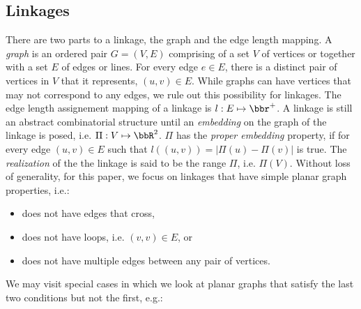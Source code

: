 \subsection{Linkages}
There are two parts to a linkage, the graph and the edge length mapping.   A \textit{graph} is an 
ordered pair $G = (V,E)$ comprising of a set $V$ of vertices or together with a set $E$ of edges or 
lines.  For every edge $e \in E$, there is a distinct pair of vertices in $V$ that it represents, 
$(u,v) \in E$.  While graphs can have vertices that may not correspond to any edges, we rule out 
this possibility for linkages.  The edge length assignement mapping of a linkage is $l: E \mapsto 
\bbr^+$. A linkage is still an abstract combinatorial structure until an \textit{embedding} on the 
graph of the linkage is posed, i.e. $\Pi : V \mapsto \bbR^{2}$. $\Pi$ has the \textit{proper 
embedding} property, if for every edge $(u,v) \in E$ such that $l\left( \left(u,v\right) \right) 
= \left\vert \Pi(u) - \Pi(v) \right\vert$ is true. The \textit{realization} of the the linkage is 
said to be the range $\Pi$, i.e. $\Pi(V)$.  Without loss of generality, for this paper, we focus on 
linkages that have simple planar graph properties, i.e.:
\begin{itemize}
\item[\rn{1}] does not have edges that cross,
\item[\rn{2}] does not have loops, i.e. $(v,v) \in E$, or
\item[\rn{3}] does not have multiple edges between any pair of vertices.
\end{itemize}  
We may visit special cases in which we look at planar graphs that satisfy the last two conditions 
but not the first, e.g.:
